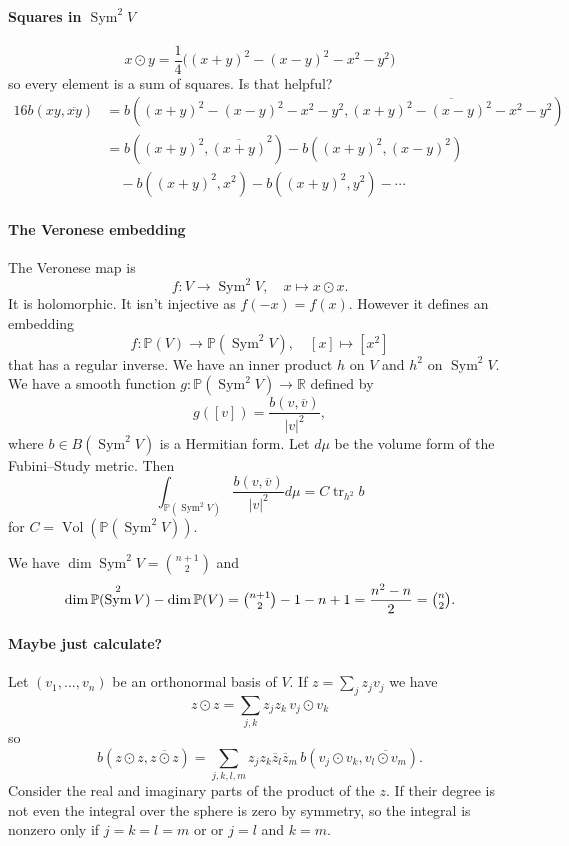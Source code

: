 \documentclass[11pt]{article}
\theoremstyle{definition}
\newcommand{\kk}[1]{\mathbb{#1}}
\def\ov#1{\overline{#1}}
\DeclareMathOperator{\Vol}{Vol}
\DeclareMathOperator{\Sym}{Sym}
\DeclareMathOperator{\tr}{tr}
\begin{document}
\paragraph{Squares in $\Sym^2 V$}

$$
x \odot y
= \frac14 \bigl( (x + y)^2 - (x - y)^2 - x^2 - y^2 \bigr)
$$
so every element is a sum of squares.
Is that helpful?
\begin{align*}
16 b(xy, \ov{xy})
&= b((x{+}y)^2 - (x{-}y)^2 - x^2 - y^2, \ov{(x{+}y)^2 - (x{-}y)^2 - x^2 - y^2})
\\
&= b((x+y)^2, \ov{(x+y)}^2)
- b((x+y)^2,(x-y)^2)
\\
&\quad
- b((x+y)^2,x^2)
- b((x+y)^2,y^2)
- \cdots
\end{align*}

\paragraph{The Veronese embedding}

The Veronese map is
$$
f : V \to \Sym^2 V,
\quad
x \mapsto x \odot x.
$$
It is holomorphic.
It isn't injective as $f(- x) = f(x)$.
However it defines an embedding
$$
f : \kk P(V) \to \kk P(\Sym^2 V),
\quad
[x] \mapsto [x^2]
$$
that has a regular inverse.
We have an inner product $h$ on $V$ and $h^2$ on $\Sym^2 V$.
We have a smooth function $g : \kk P(\Sym^2 V) \to \kk R$ defined by
$$
g([v]) = \frac{b(v, \ov{v})}{|v|^2},
$$
where $b \in B(\Sym^2 V)$ is a Hermitian form.
Let $d\mu$ be the volume form of the Fubini--Study metric.
Then
$$
\int_{\kk P(\Sym^2 V)} \frac{b(v, \ov v)}{|v|^2} d\mu
= C \tr_{h^2} b
$$
for $C = \Vol(\kk P(\Sym^2 V))$.

We have $\dim \Sym^2 V = \binom{n+1}2$ and
$$
\dim \kk P(\Sym^2 V) - \dim \kk P(V)
= \tbinom{n+1}{2} - 1 - n + 1
= \frac{n^2 - n}{2}
= \tbinom{n}{2}.
$$



\paragraph{Maybe just calculate?}


Let $(v_1, \ldots, v_n)$ be an orthonormal basis of $V$.
If $z = \sum_j z_j v_j$ we have
$$
z \odot z
= \sum_{j,k} z_j z_k \, v_j \odot v_k
$$
so
$$
b(z \odot z, \ov{z \odot z})
= \sum_{j,k,l,m} z_j z_k \ov z_l \ov z_m
\, b(v_j \odot v_k, \ov{v_l \odot v_m}).
$$
Consider the real and imaginary parts of the product of the $z$.
If their degree is not even the integral over the sphere is zero by symmetry,
so the integral is nonzero only if $j = k = l = m$ or or $j = l$ and $k = m$.
\end{document}
